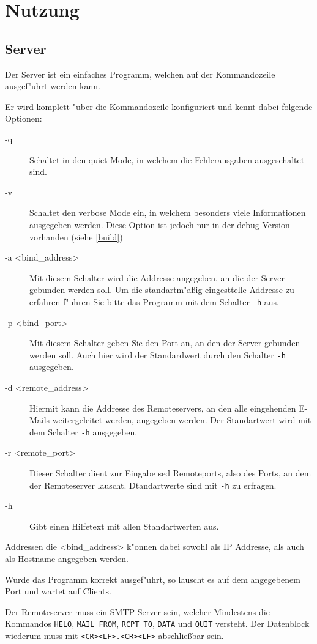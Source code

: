 \documentclass[pdftex,final,a4paper,10pt,notitlepage,halfparskip]{scrreprt}
\begin{document}
\chapter{Nutzung}
\section{Server}
Der Server ist ein einfaches Programm, welchen auf der Kommandozeile ausgef"{u}hrt werden kann.

Er wird komplett "{u}ber die Kommandozeile konfiguriert und kennt dabei folgende Optionen:
\begin{description}
  \item[-q] Schaltet in den quiet Mode, in welchem die Fehlerausgaben ausgeschaltet sind.
  \item[-v] Schaltet den verbose Mode ein, in welchem besonders viele Informationen ausgegeben werden. Diese Option ist jedoch nur in der debug Version vorhanden (siehe \ref{build})
  \item[-a <bind\_address>] Mit diesem Schalter wird die Addresse angegeben, an die der Server gebunden werden soll. Um die standartm"{a}ßig eingesttelle Addresse zu erfahren f"{u}hren Sie bitte das Programm mit dem Schalter \texttt{-h} aus. 
  \item[-p <bind\_port>] Mit diesem Schalter geben Sie den Port an, an den der Server gebunden werden soll. Auch hier wird der Standardwert durch den Schalter \texttt{-h} ausgegeben.
  \item[-d <remote\_address>] Hiermit kann die Addresse des Remoteservers, an den alle eingehenden E-Mails weitergeleitet werden, angegeben werden. Der Standartwert wird mit dem Schalter \texttt{-h} ausgegeben.
  \item[-r <remote\_port>] Dieser Schalter dient zur Eingabe sed Remoteports, also des Ports, an dem der Remoteserver lauscht. Dtandartwerte sind mit \texttt{-h} zu erfragen.
  \item[-h] Gibt einen Hilfetext mit allen Standartwerten aus. 
\end{description}
Addressen die <bind\_address> k"{o}nnen dabei sowohl als IP Addresse, als auch als Hostname angegeben werden.

Wurde das Programm korrekt ausgef"{u}hrt, so lauscht es auf dem angegebenem Port und wartet auf Clients.

Der Remoteserver muss ein SMTP Server sein, welcher Mindestens die Kommandos \texttt{HELO}, \texttt{MAIL FROM}, \texttt{RCPT TO}, \texttt{DATA} und \texttt{QUIT} versteht. Der Datenblock wiederum muss mit \texttt{<CR><LF>.<CR><LF>} abschließbar sein.
\end{document}

